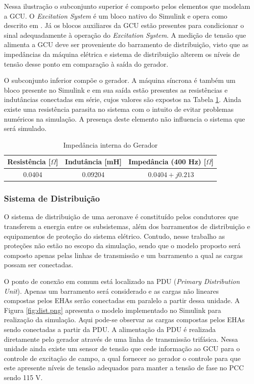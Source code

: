 Nessa ilustração o subconjunto superior é composto pelos elementos que modelam a GCU. O \textit{Excitation System} é um bloco nativo do Simulink e opera como descrito em \cite{IEEE}. Já os blocos auxiliares da GCU estão presentes para condicionar o sinal adequadamente à operação do \textit{Excitation System}. A medição de tensão que alimenta a GCU deve ser proveniente do barramento de distribuição, visto que as impedâncias da máquina elétrica e sistema de distribuição alterem os níveis de tensão desse ponto em comparação à saída do gerador.

O subconjunto inferior compõe o gerador. A máquina síncrona é também um bloco presente no Simulink e em sua saída estão presentes as resistências e indutâncias conectadas em série, cujos valores são expostos na Tabela \ref{tab:Zgen}.  Ainda existe uma resistência parasita no sistema com o intuito de evitar problemas numéricos na simulação. A presença deste elemento não influencia o sistema que será simulado.

\begin{table}[!htb]
	\centering
	\begin{tabular}{|c|c|c|}
		\hline
		\textbf{Resistência	[$\Omega$]}	& \textbf{Indutância [mH]}	& \textbf{Impedância (400 Hz) [$\Omega$]}\\\hline
		0.0404					& 0.09204			& $0.0404+j0.213$\\
		\hline
	\end{tabular}
	\caption{Impedância interna do Gerador}
	\label{tab:Zgen}
\end{table}

\subsubsection{Sistema de Distribuição}

O sistema de distribuição de uma aeronave é constituído pelos condutores que transferem a energia entre os subsistemas, além dos barramentos de distribuição e equipamentos de proteção do sistema elétrico. Contudo, nesse trabalho as proteções não estão no escopo da simulação, sendo que o modelo proposto será composto apenas pelas linhas de transmissão e um barramento a qual as cargas possam ser conectadas.

O ponto de conexão em comum está localizado na PDU (\textit{Primary Distribution Unit}). Apenas um barramento será considerado e as cargas não lineares compostas pelos EHAs serão conectadas em paralelo a partir dessa unidade. A Figura \ref{fig:dist.png} apresenta o modelo implementado no Simulink para realização da simulação. Aqui pode-se observar as cargas compostas pelos EHAs sendo conectadas a partir da PDU. A alimentação da PDU é realizada diretamente pelo gerador através de uma linha de transmissão trifásica. Nessa unidade ainda existe um sensor de tensão que cede informação ao GCU para o controle de excitação de campo, a qual fornecer ao gerador o controle para que este apresente níveis de tensão adequados para manter a tensão de fase no PCC sendo 115 V.


